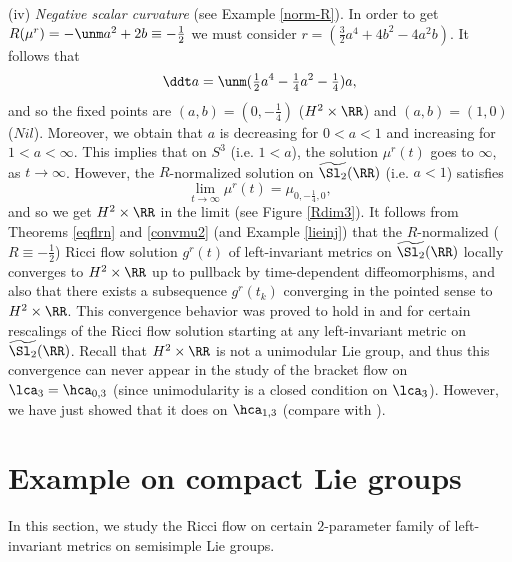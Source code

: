 \documentclass[11pt]{amsart}
\theoremstyle{plain}
\theoremstyle{definition}
\theoremstyle{remark}
\begin{document}
\no
(iv) {\it Negative scalar curvature} (see Example \ref{norm-R}).  In order to get $R(\mu^r)=-\unm a^2+2b\equiv -\frac{1}{2}$ we must consider
$r=(\tfrac{3}{2}a^4+4b^2-4a^2b)$.  It follows that
$$
\ddt a=\unm(\tfrac{1}{2}a^4-\tfrac{1}{4}a^2-\tfrac{1}{4})a,
$$
and so the fixed points are $(a,b)=(0,-\frac{1}{4})$ ($H^2\times\RR$) and $(a,b)=(1,0)$ ($Nil$).  Moreover, we obtain that $a$ is decreasing for $0<a<1$ and increasing for $1<a<\infty$.   This implies that on $S^3$ (i.e. $1<a$), the solution $\mu^r(t)$ goes to $\infty$, as $t\to\infty$.  However, the $R$-normalized solution on $\widetilde{\Sl_2}(\RR)$ (i.e. $a<1$) satisfies
$$
\lim_{t\to\infty} \mu^r(t) = \mu_{0,-\frac{1}{4},0},
$$
and so we get $H^2\times\RR$ in the limit (see Figure \ref{Rdim3}).  It follows from Theorems \ref{eqflrn} and \ref{convmu2} (and Example \ref{lieinj}) that the $R$-normalized ($R\equiv -\frac{1}{2}$) Ricci flow solution $g^r(t)$ of left-invariant metrics on $\widetilde{\Sl_2}(\RR)$ locally converges to $H^2\times\RR$ up to pullback by time-dependent diffeomorphisms, and also that there exists a subsequence $g^r(t_k)$ converging in the pointed sense to $H^2\times\RR$.  This convergence behavior was proved to hold in \cite[3.3.5]{Ltt} and \cite[4.3.1]{Glc} for certain rescalings of the Ricci flow solution starting at any left-invariant metric on $\widetilde{\Sl_2}(\RR)$.  Recall that $H^2\times\RR$ is not a unimodular Lie group, and thus this convergence can never appear in the study of the bracket flow on $\lca_3=\hca_{0,3}$ (since unimodularity is a closed condition on $\lca_3$).  However, we have just showed that it does on $\hca_{1,3}$ (compare with \cite[Section 6]{GlcPyn}).
















\section{Example on compact Lie groups}\label{exss}

In this section, we study the Ricci flow on certain $2$-parameter family of left-invariant metrics on semisimple Lie groups.
\end{document}
